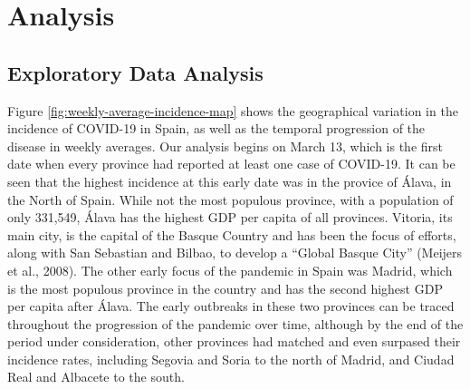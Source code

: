 \documentclass[]{elsarticle} %
\begin{document}
\hypertarget{analysis}{%
\section{Analysis}\label{analysis}}

\hypertarget{eda}{%
\subsection{Exploratory Data Analysis}\label{eda}}

Figure \ref{fig:weekly-average-incidence-map} shows the geographical
variation in the incidence of COVID-19 in Spain, as well as the temporal
progression of the disease in weekly averages. Our analysis begins on
March 13, which is the first date when every province had reported at
least one case of COVID-19. It can be seen that the highest incidence at
this early date was in the provice of Álava, in the North of Spain.
While not the most populous province, with a population of only 331,549,
Álava has the highest GDP per capita of all provinces. Vitoria, its main
city, is the capital of the Basque Country and has been the focus of
efforts, along with San Sebastian and Bilbao, to develop a ``Global
Basque City'' (Meijers et al., 2008). The other early focus of the
pandemic in Spain was Madrid, which is the most populous province in the
country and has the second highest GDP per capita after Álava. The early
outbreaks in these two provinces can be traced throughout the
progression of the pandemic over time, although by the end of the period
under consideration, other provinces had matched and even surpased their
incidence rates, including Segovia and Soria to the north of Madrid, and
Ciudad Real and Albacete to the south.
\end{document}
